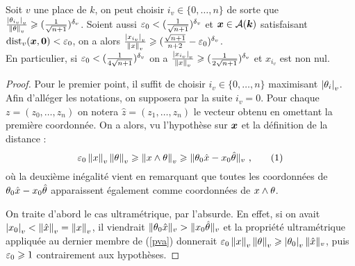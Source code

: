 \begin{lem} \label{pv}
Soit $v$ une place de $k$, on peut choisir $i_v \in \{ 0, \dots, n\}$ de sorte que $\frac{\left\lvert\theta_{i_v}\right\rvert_{v}}{\left\lVert\theta\right\rVert_{v}} \geqslant (\frac{1}{\sqrt{n+1}})^{\delta_v} $. Soient aussi $\varepsilon_0 < (\frac{1}{\sqrt{n+1}})^{\delta_v}$ et ${\boldsymbol{x}} \in \mathcal{A}(\boldsymbol{k})$ satisfaisant $\mathrm{dist}_v({\boldsymbol{x}}, {\boldsymbol{0}}) < \varepsilon_0$, on a alors $\frac{\left\lvert x_{i_v}\right\rvert_{v}}{\left\lVert x\right\rVert_{v}} \geqslant (\frac{\sqrt{n+1}}{n+2}-\varepsilon_0)^{\delta_v}$. \\
En particulier, si $\varepsilon_0 < (\frac{1}{4\sqrt{n+1}})^{\delta_v}$ on a $\frac{\left\lvert x_{i_v}\right\rvert_{v}}{\left\lVert x\right\rVert_{v}} \geqslant (\frac{1}{2\sqrt{n+1}})^{\delta_v}$ et $x_{i_v}$ est non nul.
\end{lem}

\begin{proof}
Pour le premier point, il suffit de choisir $i_v \in \{ 0, \dots, n\}$ maximisant $\left\lvert\theta_i\right\rvert_{v}$. Afin d'alléger les notations, on supposera par la suite $i_v = 0$. Pour chaque $z = (z_0, \dots, z_n)$ on notera $\hat{z} = (z_1, \dots, z_n)$ le vecteur obtenu en omettant la première coordonnée. On a alors, vu l'hypothèse sur ${\boldsymbol{x}}$ et la définition de la distance :
\[ \varepsilon_0 \left\lVert x\right\rVert_{v}\left\lVert\theta\right\rVert_{v}  \geqslant \left\lVert x \wedge \theta\right\rVert_{v} \geqslant \|\theta_0 \hat{x} - x_0 \hat{\theta}\|_{v} \text{ ,} \label{pva} \tag{1}\]
où la deuxième inégalité vient en remarquant que toutes les coordonnées de $\theta_0 \hat{x} - x_0 \hat{\theta}$ apparaissent également comme coordonnées de $x \wedge \theta$.

On traite d'abord le cas ultramétrique, par l'absurde. En effet, si on avait $\left\lvert x_0\right\rvert_{v}< \left\lVert\hat{x}\right\rVert_{v} = \left\lVert x\right\rVert_{v}$, il viendrait $\|\theta_0 \hat{x}\|_{v} > \|x_0 \hat{\theta}\|_{v}$ et la propriété ultramétrique appliquée au dernier membre de (\ref{pva}) donnerait $\varepsilon_0 \left\lVert x\right\rVert_{v}\left\lVert\theta\right\rVert_{v}  \geqslant \left\lvert\theta_0\right\rvert_{v}\|\hat{x}\|_{v}$, puis $\varepsilon_0 \geqslant 1$ contrairement aux hypothèses.


\end{proof}
